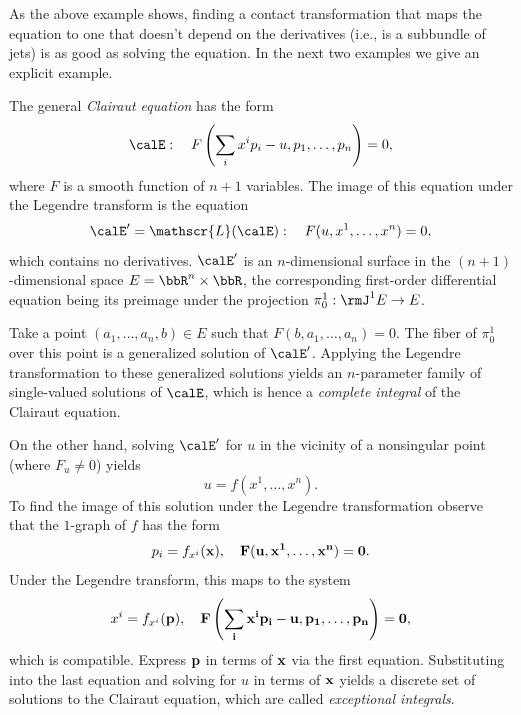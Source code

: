 As the above example shows, finding a contact transformation that maps the equation to one that doesn't depend on the derivatives (i.e., is a subbundle of jets) is as good as solving the equation. In the next two examples we give an explicit example.

\begin{example}
    The general \emph{Clairaut equation} has the form 
    \[\calE:\quad F\left(\sum_i x^ip_i-u,p_1,\ldots,p_n\right)=0,\]
    where $F$ is a smooth function of $n+1$ variables. The image of this equation under the Legendre transform is the equation 
    \[\calE'=\mathscr{L}(\calE):\quad F(u,x^1,\ldots,x^n)=0,\]
    which contains no derivatives. $\calE'$ is an $n$-dimensional surface in the $(n+1)$-dimensional space $E=\bbR^n\times\bbR$, the corresponding first-order differential equation being its preimage under the projection $\pi^1_0:\rmJ^1E\to E$.

    Take a point $(a_1,\ldots,a_n,b)\in E$ such that $F(b,a_1,\ldots,a_n)=0$. The fiber of $\pi^1_0$ over this point is a generalized solution of $\calE'$. Applying the Legendre transformation to these generalized solutions yields an $n$-parameter family of single-valued solutions of $\calE$, which is hence a \emph{complete integral} of the Clairaut equation.

    On the other hand, solving $\calE'$ for $u$ in the vicinity of a nonsingular point (where $F_u\neq 0$) yields 
    \[u=f(x^1,\ldots,x^n).\]
    To find the image of this solution under the Legendre transformation observe that the $1$-graph of $f$ has the form 
    \[p_i=f_{x^i}(\bf{x}),\quad F(u,x^1,\ldots,x^n)=0.\]
    Under the Legendre transform, this maps to the system 
    \[x^i=f_{x^i}(\bf{p}),\quad F\left(\sum_i x^ip_i-u,p_1,\ldots,p_n\right)=0,\]
    which is compatible. Express $\bf{p}$ in terms of $\bf{x}$ via the first equation. Substituting into the last equation and solving for $u$ in terms of $\bf{x}$ yields a discrete set of solutions to the Clairaut equation, which are called \emph{exceptional integrals}.
\end{example}

